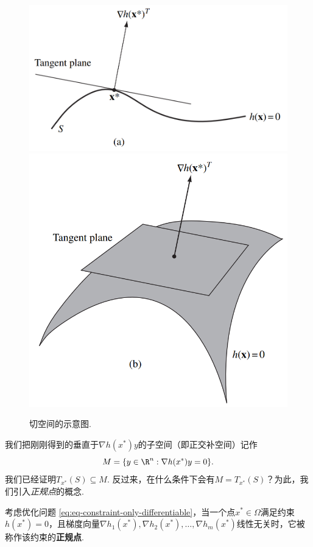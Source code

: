 \begin{figure}
\centering
    \includegraphics[scale=0.4]{Figures/duality/tan-1dim.png}
\centering
    \includegraphics[scale=0.4]{Figures/duality/tan-2dim.png}
\caption{切空间的示意图.}
\label{fig:tangent-space}
\end{figure}
    
我们把刚刚得到的垂直于$\nabla {h(x^\ast)y}$的子空间（即正交补空间）记作
    \[M=\{{y}\in\R^n:\nabla {h(x^\ast)y}=0\}.\]
我们已经证明$T_{x^\ast}(S)\subseteq M$. 反过来，在什么条件下会有$M=T_{x^\ast}(S)$？为此，我们引入\emph{正规点}的概念. 

\begin{definition}[正规点]\label{def:regular-point}
考虑优化问题 \eqref{eq:eq-constraint-only-differentiable}，当一个点${x^\ast}\in\Omega$满足约束${h(x^\ast)}=0$，且梯度向量$\nabla h_1({x^\ast}),\nabla h_2({x^\ast}),\dots,\nabla h_m({x^\ast})$线性无关时，它被称作该约束的\textbf{正规点}. 
\end{definition}

